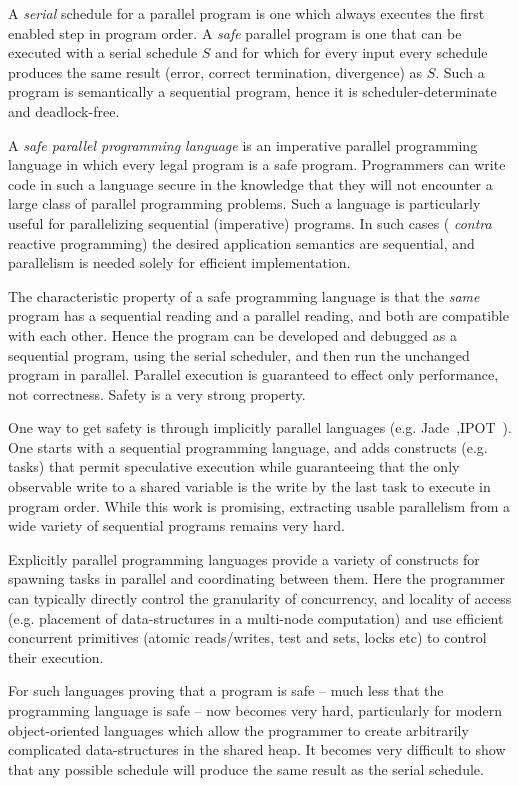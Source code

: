 A {\em serial} schedule for a parallel program is one which always
executes the first enabled step in program order. A {\em safe}
parallel program is one that can be executed with a serial schedule
$S$ and for which for every input every schedule produces the same
result (error, correct termination, divergence) as $S$.  Such a
program is semantically a sequential program, hence it is
scheduler-determinate and deadlock-free.

A {\em safe parallel programming language} is an imperative parallel
programming language in which every legal program is a safe
program. Programmers can write code in such a language secure in the
knowledge that they will not encounter a large class of parallel
programming problems. Such a language is particularly useful for
parallelizing sequential (imperative) programs. In such cases ({\em
  contra} reactive programming) the desired application semantics are
sequential, and parallelism is needed solely for efficient
implementation.

The characteristic property of a safe programming language is that the
{\em same} program has a sequential reading and a parallel reading,
and both are compatible with each other. Hence the program can be
developed and debugged as a sequential program, using the serial
scheduler, and then run the unchanged program in parallel.  Parallel
execution is guaranteed to effect only performance, not
correctness. Safety is a very strong property.

One way to get safety is through implicitly parallel languages (e.g.{}
Jade~\cite{Rinard98thedesign},IPOT~\cite{vonPraun:2007:IPO:1229428.1229443}). One
starts with a sequential programming language, and adds constructs
(e.g.{} tasks) that permit speculative execution while guaranteeing
that the only observable write to a shared variable is the write by
the last task to execute in program order.  While this work is
promising, extracting usable parallelism from a wide variety of
sequential programs remains very hard.

Explicitly parallel programming languages provide a variety of
constructs for spawning tasks in parallel and coordinating between
them. Here the programmer can typically directly control the
granularity of concurrency, and locality of access (e.g. placement of
data-structures in a multi-node computation) and use efficient
concurrent primitives (atomic reads/writes, test and sets, locks etc)
to control their execution.

For such languages proving that a program is safe -- much less that
the programming language is safe -- now becomes very hard,
particularly for modern object-oriented languages which allow the
programmer to create arbitrarily complicated data-structures in the
shared heap. It becomes very difficult to show that any possible
schedule will produce the same result as the serial schedule.

